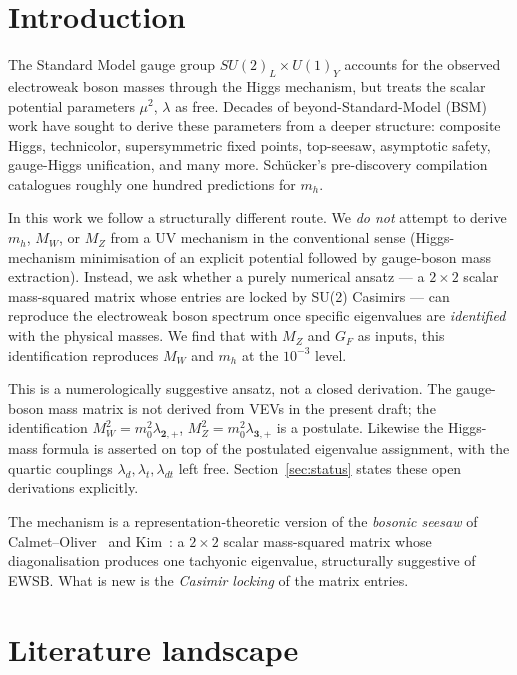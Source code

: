 \documentclass[11pt,a4paper]{article}
\newcommand{\md}{\mathbf{2}}
\newcommand{\mt}{\mathbf{3}}
\begin{document}
\section{Introduction}

The Standard Model gauge group $SU(2)_L \times U(1)_Y$ accounts for the
observed electroweak boson masses through the Higgs mechanism, but treats
the scalar potential parameters $\mu^2$, $\lambda$ as free. Decades of
beyond-Standard-Model (BSM) work have sought to derive these parameters
from a deeper structure: composite Higgs, technicolor, supersymmetric
fixed points, top-seesaw, asymptotic safety, gauge-Higgs unification, and
many more. Sch\"ucker's pre-discovery
compilation~\cite{Schucker2007} catalogues roughly one hundred
predictions for $m_h$.

In this work we follow a structurally different route. We \emph{do not}
attempt to derive $m_h$, $M_W$, or $M_Z$ from a UV mechanism in the
conventional sense (Higgs-mechanism minimisation of an explicit potential
followed by gauge-boson mass extraction). Instead, we ask whether a
purely numerical ansatz --- a $2\times 2$ scalar mass-squared matrix
whose entries are locked by SU(2) Casimirs --- can reproduce the
electroweak boson spectrum once specific eigenvalues are
\emph{identified} with the physical masses. We find that with $M_Z$ and
$G_F$ as inputs, this identification reproduces $M_W$ and $m_h$ at the
$10^{-3}$ level.

This is a numerologically suggestive ansatz, not a closed derivation. The
gauge-boson mass matrix is not derived from VEVs in the present draft;
the identification $M_W^2 = m_0^2 \lambda_{\md,+}$,
$M_Z^2 = m_0^2 \lambda_{\mt,+}$ is a postulate. Likewise the Higgs-mass
formula is asserted on top of the postulated eigenvalue assignment, with
the quartic couplings $\lambda_d, \lambda_t, \lambda_{dt}$ left free.
Section~\ref{sec:status} states these open derivations explicitly.

The mechanism is a representation-theoretic version of the
\emph{bosonic seesaw} of Calmet--Oliver~\cite{Calmet2006} and
Kim~\cite{Kim2005}: a $2\times 2$ scalar mass-squared matrix whose
diagonalisation produces one tachyonic eigenvalue, structurally
suggestive of EWSB. What is new is the \emph{Casimir locking} of the
matrix entries.

\section{Literature landscape}
\end{document}
